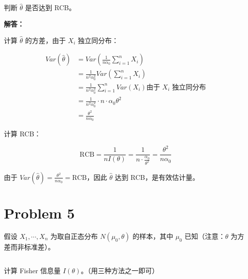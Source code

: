 \documentclass[12pt,a4paper]{article}
\begin{document}
\subsection{}

判断 $\hat{\theta}$ 是否达到 RCB。

\begin{answerbox}
\textbf{解答：}

计算 $\hat{\theta}$ 的方差，由于 $X_i$ 独立同分布：

$$
\begin{aligned}
Var(\hat{\theta}) &= Var\left(\frac{1}{n\alpha_0} \sum_{i=1}^n X_i\right) \\
&= \frac{1}{n^2 \alpha_0^2} Var(\sum_{i=1}^n X_i) \\
&= \frac{1}{n^2 \alpha_0^2} \sum_{i=1}^n Var(X_i) \text{由于 $X_i$ 独立同分布} \\
&= \frac{1}{n^2 \alpha_0^2} \cdot n \cdot \alpha_0 \theta^2 \\
&= \frac{\theta^2}{n\alpha_0}
\end{aligned}
$$

计算 RCB：

$$
\text{RCB} = \frac{1}{nI(\theta)} = \frac{1}{n \cdot \frac{\alpha_0}{\theta^2}} = \frac{\theta^2}{n\alpha_0}
$$

由于 $Var(\hat{\theta}) = \frac{\theta^2}{n\alpha_0} = \text{RCB}$，因此 $\hat{\theta}$ 达到 RCB，是有效估计量。

\end{answerbox}

\section{Problem 5}

假设 $X_1,\cdots,X_n$ 为取自正态分布 $N(\mu_0,\theta)$ 的样本，其中 $\mu_0$ 已知（注意：$\theta$ 为方差而非标准差）。

\subsection{}

计算 Fisher 信息量 $I(\theta)$。（用三种方法之一即可）
\end{document}
